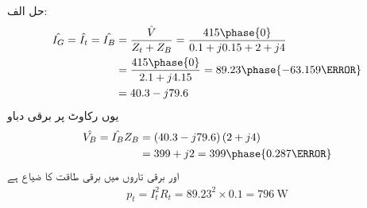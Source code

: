 حل الف:
\begin{align*}
\hat{I_G}=\hat{I_t}=\hat{I_B}&=\frac{\hat{V}}{Z_t+Z_B}=\frac{415\phase{0}}{0.1+j 0.15+2+j 4}\\
&=\frac{415\phase{0}}{2.1+j 4.15}=89.23\phase{-63.159\degree}\\
&=40.3-j79.6
\end{align*}
یوں رکاوٹ پر برقی دباو
\begin{align*}
\hat{V_B}=\hat{I_B} Z_B&=\left(40.3-j79.6 \right) \left( 2+j 4\right)\\
&=399+j2=399\phase{0.287\degree}
\end{align*}
اور برقی تاروں میں برقی طاقت کا ضیاع ہے
\begin{align*}
p_t=I_t^2 R_t=89.23^2 \times 0.1=\SI{796}{\watt}
\end{align*}

